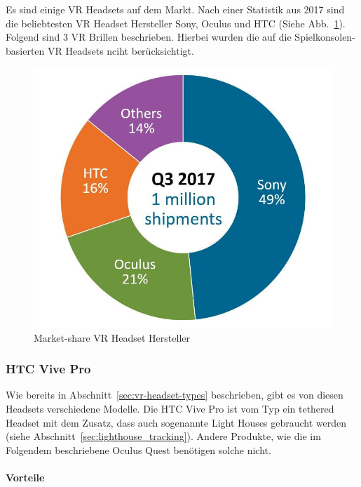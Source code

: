 Es sind einige VR Headsets auf dem Markt.
Nach einer Statistik aus 2017 sind die beliebtesten VR Headset Hersteller Sony, Oculus und HTC (Siehe Abb.~\ref{fig:vr_headset_manufacturer_marketshare}).
Folgend sind 3 VR Brillen beschrieben.
Hierbei wurden die auf die Spielkonsolen-basierten VR Headsets nciht berücksichtigt.

\begin{figure}
    \centering
    \includegraphics[scale=0.25]{pics/vr_headset_manufacturer_marketshare}
    \caption{Market-share VR Headset Hersteller~\cite{MARTINDALE_2017}}
    \label{fig:vr_headset_manufacturer_marketshare}
\end{figure}

\subsubsection{HTC Vive Pro}\label{sec:htc-vive}

Wie bereits in Abschnitt~\ref{sec:vr-headset-types} beschrieben, gibt es von diesen Headsets verschiedene Modelle.
Die HTC Vive Pro ist vom Typ ein tethered Headset mit dem Zusatz, dass auch sogenannte Light Houses gebraucht werden (siehe Abschnitt~\ref{sec:lighthouse_tracking}).
Andere Produkte, wie die im Folgendem beschriebene Oculus Quest benötigen solche nicht.

\paragraph{Vorteile}

